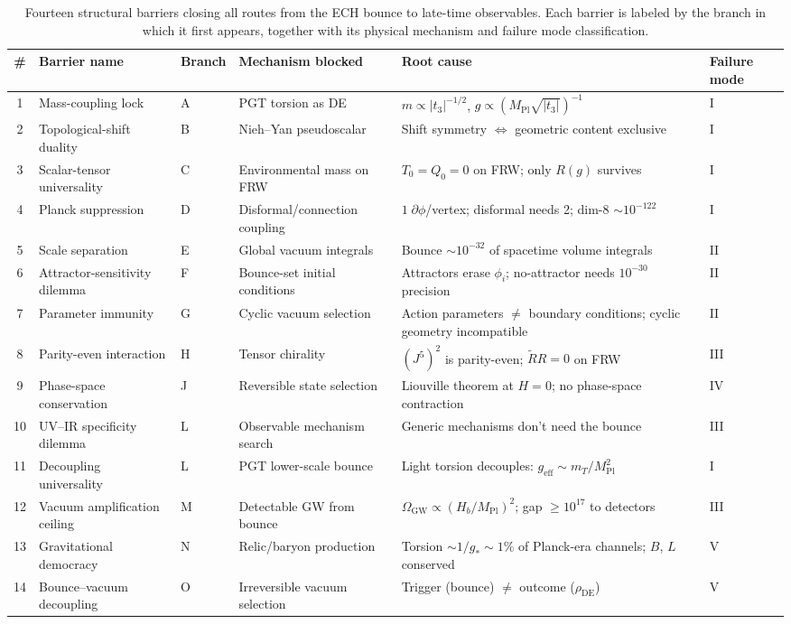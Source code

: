 \begin{table}[t]
\centering
\caption{Fourteen structural barriers closing all routes from the ECH bounce to
  late-time observables.  Each barrier is labeled by the branch in which it
  first appears, together with its physical mechanism and failure mode
  classification.}
\label{tab:barriers}
\begin{tabular}{clllll}
\hline\hline
\# & Barrier name & Branch & Mechanism blocked & Root cause & Failure mode \\
\hline
1  & Mass-coupling lock
   & A & PGT torsion as DE
   & $m \propto |t_3|^{-1/2}$,\; $g \propto (M_\mathrm{Pl}\sqrt{|t_3|})^{-1}$
   & I \\
2  & Topological-shift duality
   & B & Nieh--Yan pseudoscalar
   & Shift symmetry $\Leftrightarrow$ geometric content exclusive
   & I \\
3  & Scalar-tensor universality
   & C & Environmental mass on FRW
   & $T_0 = Q_0 = 0$ on FRW;\; only $R(g)$ survives
   & I \\
4  & Planck suppression
   & D & Disformal/connection coupling
   & $1\;\partial\phi$/vertex;\; disformal needs 2;\; dim-8 $\sim 10^{-122}$
   & I \\
5  & Scale separation
   & E & Global vacuum integrals
   & Bounce $\sim 10^{-32}$ of spacetime volume integrals
   & II \\
6  & Attractor-sensitivity dilemma
   & F & Bounce-set initial conditions
   & Attractors erase $\phi_i$; no-attractor needs $10^{-30}$ precision
   & II \\
7  & Parameter immunity
   & G & Cyclic vacuum selection
   & Action parameters $\neq$ boundary conditions;\; cyclic geometry incompatible
   & II \\
8  & Parity-even interaction
   & H & Tensor chirality
   & $(J^5)^2$ is parity-even;\; $\tilde{R}R = 0$ on FRW
   & III \\
9  & Phase-space conservation
   & J & Reversible state selection
   & Liouville theorem at $H=0$;\; no phase-space contraction
   & IV \\
10 & UV--IR specificity dilemma
   & L & Observable mechanism search
   & Generic mechanisms don't need the bounce
   & III \\
11 & Decoupling universality
   & L & PGT lower-scale bounce
   & Light torsion decouples: $g_\mathrm{eff} \sim m_T/M_\mathrm{Pl}^2$
   & I \\
12 & Vacuum amplification ceiling
   & M & Detectable GW from bounce
   & $\Omega_\mathrm{GW} \propto (H_b/M_\mathrm{Pl})^2$;\; gap $\geq 10^{17}$ to detectors
   & III \\
13 & Gravitational democracy
   & N & Relic/baryon production
   & Torsion $\sim 1/g_* \sim 1\%$ of Planck-era channels;\; $B$, $L$ conserved
   & V \\
14 & Bounce--vacuum decoupling
   & O & Irreversible vacuum selection
   & Trigger (bounce) $\neq$ outcome ($\rho_\mathrm{DE}$)
   & V \\
\hline\hline
\end{tabular}
\end{table}


